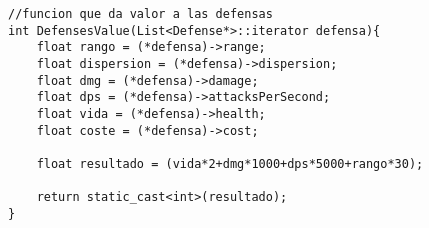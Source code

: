 \begin{lstlisting}
//funcion que da valor a las defensas
int DefensesValue(List<Defense*>::iterator defensa){
    float rango = (*defensa)->range;
    float dispersion = (*defensa)->dispersion;
    float dmg = (*defensa)->damage;
    float dps = (*defensa)->attacksPerSecond;
    float vida = (*defensa)->health;
    float coste = (*defensa)->cost;
    
    float resultado = (vida*2+dmg*1000+dps*5000+rango*30);

    return static_cast<int>(resultado);
}
\end{lstlisting}
